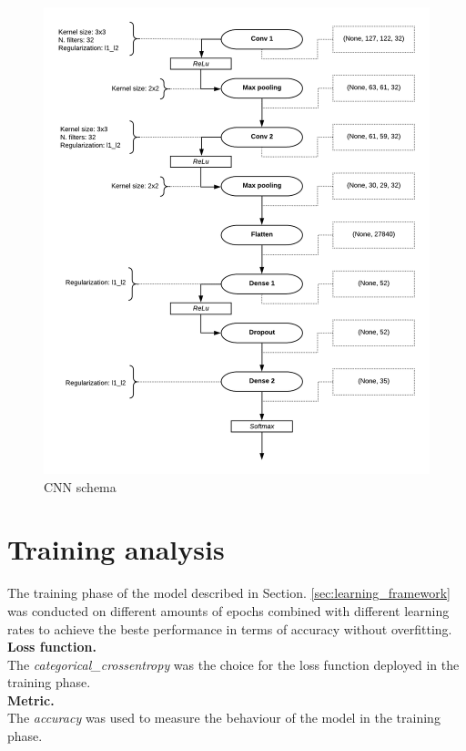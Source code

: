 \begin{figure}[ht]
	\centering
	\includegraphics[scale=0.6]{CNN_schema}
	\caption{CNN schema}
	\label{fig:CNN_schema}
\end{figure} 

\section{Training analysis}
\noindent The training phase of the model described in Section. \ref{sec:learning_framework} was conducted on different amounts of epochs combined with different learning rates to achieve the beste performance in terms of accuracy without overfitting.\\

\noindent \textbf{Loss function.}\\ The {\it{categorical\_crossentropy}} was the choice for the loss function deployed in the training phase.\\

\noindent \textbf{Metric.}\\ The {\it{accuracy}} was used to measure the behaviour of the model in the training phase.\\

